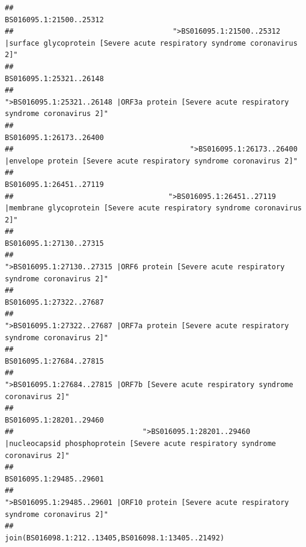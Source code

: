 \documentclass[
]{article}
\begin{document}
\begin{verbatim}
##                                                                                                                BS016095.1:21500..25312 
##                                     ">BS016095.1:21500..25312 |surface glycoprotein [Severe acute respiratory syndrome coronavirus 2]" 
##                                                                                                                BS016095.1:25321..26148 
##                                            ">BS016095.1:25321..26148 |ORF3a protein [Severe acute respiratory syndrome coronavirus 2]" 
##                                                                                                                BS016095.1:26173..26400 
##                                         ">BS016095.1:26173..26400 |envelope protein [Severe acute respiratory syndrome coronavirus 2]" 
##                                                                                                                BS016095.1:26451..27119 
##                                    ">BS016095.1:26451..27119 |membrane glycoprotein [Severe acute respiratory syndrome coronavirus 2]" 
##                                                                                                                BS016095.1:27130..27315 
##                                             ">BS016095.1:27130..27315 |ORF6 protein [Severe acute respiratory syndrome coronavirus 2]" 
##                                                                                                                BS016095.1:27322..27687 
##                                            ">BS016095.1:27322..27687 |ORF7a protein [Severe acute respiratory syndrome coronavirus 2]" 
##                                                                                                                BS016095.1:27684..27815 
##                                                    ">BS016095.1:27684..27815 |ORF7b [Severe acute respiratory syndrome coronavirus 2]" 
##                                                                                                                BS016095.1:28201..29460 
##                              ">BS016095.1:28201..29460 |nucleocapsid phosphoprotein [Severe acute respiratory syndrome coronavirus 2]" 
##                                                                                                                BS016095.1:29485..29601 
##                                            ">BS016095.1:29485..29601 |ORF10 protein [Severe acute respiratory syndrome coronavirus 2]" 
##                                                                                    join(BS016098.1:212..13405,BS016098.1:13405..21492) 

\end{verbatim}
\end{document}
